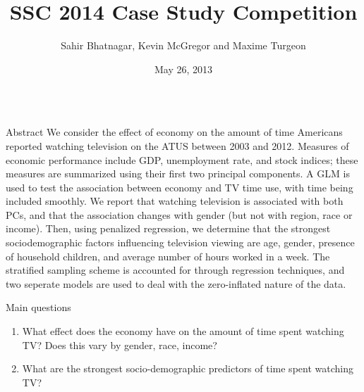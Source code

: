 \documentclass[final]{beamer}
\title{SSC 2014 Case Study Competition}
\author{Sahir Bhatnagar, Kevin McGregor and Maxime Turgeon}
\institute{Department of Epidemiology, Biostatistics and Occupational Health, McGill University}
\date{May 26, 2013}
\newcounter{acolumn}%
\def\autoheight{\vspace*{0pt}}%
\begin{document}
  \begin{frame} 
    \vfill
    
        \begin{acolumns}[t]
          
          
          
          \begin{column}{.24\linewidth}
          
          
            \begin{block}{Abstract}
    			We consider the effect of economy on the amount of time Americans reported watching television on the ATUS  between 2003 and 2012. Measures of economic performance include GDP, unemployment rate, and stock indices; these measures are summarized using their first two principal components. A GLM is used to test the association between economy and TV time use, with time being included smoothly. We report that watching television is associated with both PCs, and that the association changes with gender (but not with region, race or income). Then, using penalized regression, we determine that the strongest sociodemographic factors influencing television viewing are age, gender, presence of household children, and average number of hours worked in a week.  The stratified sampling scheme is accounted for through regression techniques, and two seperate models are used to deal with the zero-inflated nature of the data. 
            
            \end{block}
            
            \begin{block}{Main questions}
                        
                        \begin{enumerate}
                        	\item What effect does the economy have on the amount of time spent watching TV? Does this vary by gender, race, income? 
            
                        	\item What are the strongest socio-demographic predictors of time spent watching TV?
                        \end{enumerate}
                        \autoheight
                       \end{block}
            
          
          \end{column}
          

\end{acolumns}
\end{frame}
\end{document}
